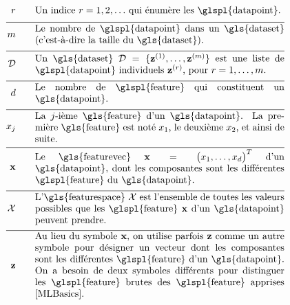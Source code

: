 \begin{align}
	\sampleidx \quad\quad & \parbox{.75\textwidth}{Un indice $\sampleidx=1,2,\ldots$ qui énumère les \glspl{datapoint}.}   \nonumber \\[2mm] \hline \nonumber\\[-5mm]
	\samplesize \quad\quad &\parbox{.75\textwidth}{Le nombre de \glspl{datapoint} dans un \gls{dataset} (c’est-à-dire la taille du \gls{dataset}).} \nonumber \\[2mm] \hline \nonumber\\[-5mm] 
	\dataset \quad\quad & \parbox{.75\textwidth}{Un \gls{dataset} $\dataset = \{ \datapoint^{(1)},\ldots, \datapoint^{(\samplesize)} \}$ 
		est une liste de \glspl{datapoint} individuels $\datapoint^{(\sampleidx)}$, pour $\sampleidx=1,\ldots,\samplesize$.}   \nonumber \\[2mm] \hline \nonumber\\[-5mm]
	\featurelen \quad\quad &\parbox{.75\textwidth}{Le nombre de \glspl{feature} qui constituent un \gls{datapoint}.}\nonumber \\[2mm] \hline \nonumber\\[-5mm]
	\feature_{\featureidx} \quad\quad &\parbox{.75\textwidth}{La $\featureidx$-ième \gls{feature} d’un \gls{datapoint}. La première \gls{feature} 
		est noté $\feature_{1}$, le deuxième $\feature_{2}$, et ainsi de suite. } \nonumber \\[2mm] \hline \nonumber\\[-5mm] 
	\featurevec \quad\quad &\parbox{.75\textwidth}{Le \gls{featurevec} $\featurevec=\big(\feature_{1},\ldots,\feature_{\featuredim}\big)^{T}$ d’un \gls{datapoint}, dont les composantes 
		sont les différentes \glspl{feature} du \gls{datapoint}.}\nonumber \\[2mm] \hline \nonumber\\[-5mm]
	\featurespace \quad\quad & \parbox{.75\textwidth}{L'\gls{featurespace} $\featurespace$ est 
		l’ensemble de toutes les valeurs possibles que les \glspl{feature} $\featurevec$ d’un \gls{datapoint} peuvent prendre.} \nonumber \\[2mm] \hline \nonumber\\[-5mm]
	\rawfeaturevec \quad\quad &\parbox{.75\textwidth}{Au lieu du symbole $\featurevec$, on utilise parfois $\rawfeaturevec$ comme un autre symbole pour désigner un vecteur dont les composantes 
		sont les différentes \glspl{feature} d’un \gls{datapoint}. On a besoin de deux symboles différents pour distinguer les \glspl{feature} brutes des \glspl{feature} apprises \cite[Ch. 9]{MLBasics}.}\nonumber
\end{align}

